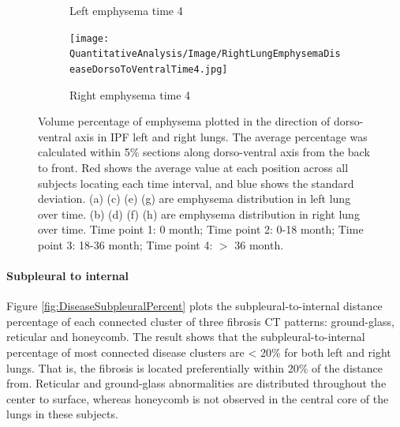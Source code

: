 \begin{figure}[H]
\begin{subfigure}{.41\linewidth}
  \caption{Left emphysema time 4}
  \label{fig:DiseaseDorsoToVentralOverTime4-g} 
\end{subfigure} 
\begin{subfigure}{.41\linewidth}%
  \texttt{[image: QuantitativeAnalysis/Image/RightLungEmphysemaDiseaseDorsoToVentralTime4.jpg]}
  \caption{Right emphysema time 4}
  \label{fig:DiseaseDorsoToVentralOverTime4-h}
\end{subfigure}
\caption{Volume percentage of emphysema plotted in the direction of dorso-ventral axis in IPF left and right lungs. The average percentage was calculated within 5\% sections along dorso-ventral axis from the back to front. Red shows the average value at each position across all subjects locating each time interval, and blue shows the standard deviation. (a) (c) (e) (g) are emphysema distribution in left lung over time. (b) (d) (f) (h) are emphysema distribution in right lung over time. Time point 1: 0 month; Time point 2: 0-18 month; Time point 3: 18-36 month; Time point 4: $>$ 36 month.}
\label{fig:DiseaseDorsoToVentralOverTime4}
\end{figure}

\paragraph{Subpleural to internal}
Figure \ref{fig:DiseaseSubpleuralPercent} plots the subpleural-to-internal distance percentage of each connected cluster of three fibrosis CT patterns: ground-glass, reticular and honeycomb. The result shows that the subpleural-to-internal percentage of most connected disease clusters are < 20\% for both left and right lungs. That is, the fibrosis is located preferentially within 20\% of the distance from. Reticular and ground-glass abnormalities are distributed throughout the center to surface, whereas honeycomb is not observed in the central core of the lungs in these subjects.


